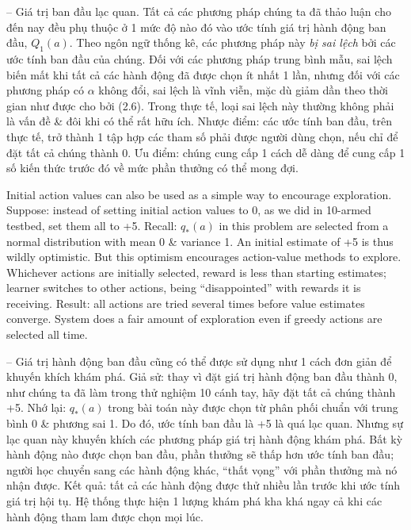 \documentclass{article}
\begin{document}
\begin{itemize}
\begin{itemize}
        -- {\sf Giá trị ban đầu lạc quan.} Tất cả các phương pháp chúng ta đã thảo luận cho đến nay đều phụ thuộc ở 1 mức độ nào đó vào ước tính giá trị hành động ban đầu, $Q_1(a)$. Theo ngôn ngữ thống kê, các phương pháp này {\it bị sai lệch} bởi các ước tính ban đầu của chúng. Đối với các phương pháp trung bình mẫu, sai lệch biến mất khi tất cả các hành động đã được chọn ít nhất 1 lần, nhưng đối với các phương pháp có $\alpha$ không đổi, sai lệch là vĩnh viễn, mặc dù giảm dần theo thời gian như được cho bởi (2.6). Trong thực tế, loại sai lệch này thường không phải là vấn đề \& đôi khi có thể rất hữu ích. Nhược điểm: các ước tính ban đầu, trên thực tế, trở thành 1 tập hợp các tham số phải được người dùng chọn, nếu chỉ để đặt tất cả chúng thành 0. Ưu điểm: chúng cung cấp 1 cách dễ dàng để cung cấp 1 số kiến thức trước đó về mức phần thưởng có thể mong đợi.

        Initial action values can also be used as a simple way to encourage exploration. Suppose: instead of setting initial action values to 0, as we did in 10-armed testbed, set them all to +5. Recall: $q_*(a)$ in this problem are selected from a normal distribution with mean 0 \& variance 1. An initial estimate of +5 is thus wildly optimistic. But this optimism encourages action-value methods to explore. Whichever actions are initially selected, reward is less than starting estimates; learner switches to other actions, being ``disappointed'' with rewards it is receiving. Result: all actions are tried several times before value estimates converge. System does a fair amount of exploration even if greedy actions are selected all time.

        -- Giá trị hành động ban đầu cũng có thể được sử dụng như 1 cách đơn giản để khuyến khích khám phá. Giả sử: thay vì đặt giá trị hành động ban đầu thành 0, như chúng ta đã làm trong thử nghiệm 10 cánh tay, hãy đặt tất cả chúng thành +5. Nhớ lại: $q_*(a)$ trong bài toán này được chọn từ phân phối chuẩn với trung bình 0 \& phương sai 1. Do đó, ước tính ban đầu là +5 là quá lạc quan. Nhưng sự lạc quan này khuyến khích các phương pháp giá trị hành động khám phá. Bất kỳ hành động nào được chọn ban đầu, phần thưởng sẽ thấp hơn ước tính ban đầu; người học chuyển sang các hành động khác, ``thất vọng'' với phần thưởng mà nó nhận được. Kết quả: tất cả các hành động được thử nhiều lần trước khi ước tính giá trị hội tụ. Hệ thống thực hiện 1 lượng khám phá kha khá ngay cả khi các hành động tham lam được chọn mọi lúc.


\end{itemize}
\end{itemize}
\end{document}
